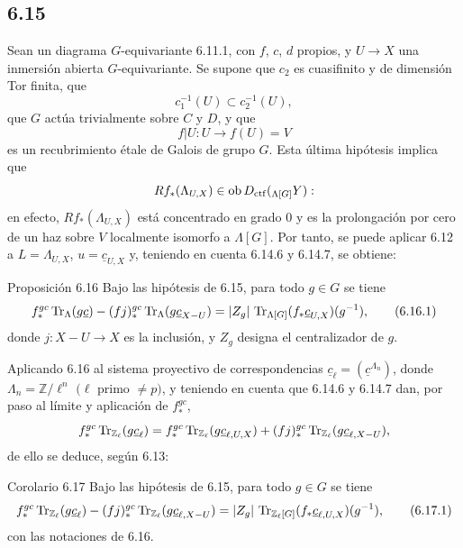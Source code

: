 \subsection*{6.15}
Sean un diagrama $G$-equivariante 6.11.1, con $f$, $c$, $d$ propios, y $U\to X$ una inmersión abierta $G$-equivariante. Se supone que $c_2$ es cuasifinito y de dimensión Tor finita, que
\[
c_1^{-1}(U)\subset c_2^{-1}(U),
\]
que $G$ actúa trivialmente sobre $C$ y $D$, y que
\[
f|U:U\longrightarrow f(U)=V
\]
es un recubrimiento étale de Galois de grupo $G$. Esta última hipótesis implica que
\[
Rf_*(\Lambda_{U,X})\in\operatorname{ob} D_{\mathrm{ctf}}({}_{\Lambda[G]}Y):
\]
en efecto, $Rf_*(\Lambda_{U,X})$ está concentrado en grado $0$ y es la prolongación por cero de un haz sobre $V$ localmente isomorfo a $\Lambda[G]$. Por tanto, se puede aplicar 6.12 a $L=\Lambda_{U,X}$, $u=\underline c_{U,X}$ y, teniendo en cuenta 6.14.6 y 6.14.7, se obtiene:

\begin{statement}{Proposición 6.16}
Bajo las hipótesis de 6.15, para todo $g\in G$ se tiene
\begin{equation}
f_*^{gc}\operatorname{Tr}_{\Lambda}(g\underline c)
-(fj)_*^{gc}\operatorname{Tr}_{\Lambda}(g\underline c_{X-U})
=
|Z_g|\,\operatorname{Tr}_{\Lambda[G]}(f_*\underline c_{U,X})(g^{-1}),
\tag{6.16.1}
\end{equation}
donde $j:X-U\to X$ es la inclusión, y $Z_g$ designa el centralizador de $g$.
\end{statement}

Aplicando 6.16 al sistema proyectivo de correspondencias $\underline c_{\ell}=(\underline c^{\Lambda_n})$, donde $\Lambda_n=\mathbb Z/\ell^n$ $(\ell$ primo $\ne p)$, y teniendo en cuenta que 6.14.6 y 6.14.7 dan, por paso al límite y aplicación de $f_*^{gc}$,
\[
f_*^{gc}\operatorname{Tr}_{\mathbb Z_{\ell}}(g\underline c_{\ell})
=
f_*^{gc}\operatorname{Tr}_{\mathbb Z_{\ell}}(g\underline c_{\ell,U,X})
+(fj)_*^{gc}\operatorname{Tr}_{\mathbb Z_{\ell}}(g\underline c_{\ell,X-U}),
\]
de ello se deduce, según 6.13:

\begin{statement}{Corolario 6.17}
Bajo las hipótesis de 6.15, para todo $g\in G$ se tiene
\begin{equation}
f_*^{gc}\operatorname{Tr}_{\mathbb Z_{\ell}}(g\underline c_{\ell})
-(fj)_*^{gc}\operatorname{Tr}_{\mathbb Z_{\ell}}(g\underline c_{\ell,X-U})
=
|Z_g|\,\operatorname{Tr}_{\mathbb Z_{\ell}[G]}(f_*\underline c_{\ell,U,X})(g^{-1}),
\tag{6.17.1}
\end{equation}
con las notaciones de 6.16.
\end{statement}

